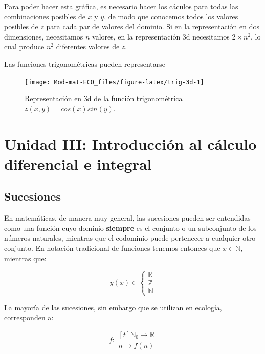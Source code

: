 \documentclass[
]{book}
\begin{document}
Para poder hacer esta gráfica, es necesario hacer los cáculos para todas las combinaciones posibles de \(x\) y \(y\), de modo que conocemos todos los valores posibles de \(z\) para cada par de valores del dominio. Si en la representación en dos dimensiones, necesitamos \(n\) valores, en la representación 3d necesitamos \(2 \times n^2\), lo cual produce \(n^2\) diferentes valores de \(z\).

Las funciones trigonométricas pueden representarse

\begin{figure}

{\centering \texttt{[image: Mod-mat-ECO\_files/figure-latex/trig-3d-1]} 

}

\caption{Representación en 3d de la función trigonométrica $z(x, y) = cos(x) sin(y)$.}\label{fig:trig-3d}
\end{figure}

\hypertarget{unidad-iii-introducciuxf3n-al-cuxe1lculo-diferencial-e-integral}{%
\chapter{Unidad III: Introducción al cálculo diferencial e integral}\label{unidad-iii-introducciuxf3n-al-cuxe1lculo-diferencial-e-integral}}

\hypertarget{sucesiones}{%
\section{Sucesiones}\label{sucesiones}}

En matemáticas, de manera muy general, las sucesiones pueden ser entendidas como una función cuyo dominio \textbf{siempre} es el conjunto o un subconjunto de los números naturales, mientras que el codominio puede pertenecer a cualquier otro conjunto. En notación tradicional de funciones tenemos entonces que \(x \in \mathbb{N}\), mientras que:

\begin{equation}
y(x) \in \begin{cases}\mathbb{R}\\ \mathbb{Z}\\ \mathbb{N} \end{cases}
\end{equation}

La mayoría de las sucesiones, sin embargo que se utilizan en ecología, corresponden a:

\begin{equation}
    f: 
    \begin{aligned}[t] 
            \mathbb{N}_0 \rightarrow \mathbb{R} \\
            n \rightarrow f(n)
    \end{aligned}
\end{equation}
\end{document}
